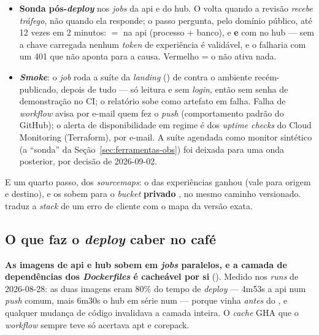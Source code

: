 \begin{itemize}
  \item \textbf{Sonda pós-\emph{deploy}} nos \emph{jobs} da api e do hub. O
     volta quando a revisão \emph{recebe tráfego}, não
    quando ela responde; o passo pergunta, pelo domínio público, até 12 vezes
    em 2 minutos:  \(=\)  na api (processo +
    banco), e  \textbf{e} 
    com  no hub --- sem a chave carregada nenhum \emph{token} de
    experiência é validável, e o  falharia com um 401 que não
    aponta para a causa. Vermelho = o  não ativa nada.
  \item \textbf{\emph{Smoke}}: o \emph{job}  roda a suíte da
    \emph{landing} () de  contra o ambiente
    recém-publicado, depois de tudo --- só leitura e sem \emph{login}, então sem
    senha de demonstração no CI; o relatório sobe como artefato em falha.
    Falha de \emph{workflow} avisa por e-mail quem fez o \emph{push}
    (comportamento padrão do GitHub); o alerta de disponibilidade em regime é
    dos \emph{uptime checks} do Cloud Monitoring (Terraform), por e-mail. A
    suíte agendada como monitor sintético (a \enquote{sonda} da
    Seção~\ref{sec:ferramentas-obs}) foi deixada para uma onda posterior, por
    decisão de 2026-09-02.
\end{itemize}

E um quarto passo, dos \emph{sourcemaps}: o  das experiências ganhou
 (vale para origem e destino), e os
 sobem para o \emph{bucket} \textbf{privado} ,
no mesmo caminho versionado.  traduz a
\emph{stack} de um erro de cliente com o mapa da versão exata.

\subsection{O que faz o \emph{deploy} caber no café}

\begin{decisao}
\textbf{As imagens de api e hub sobem em \emph{jobs} paralelos, e a camada de
dependências dos \emph{Dockerfiles} é cacheável por si} (). Medido
nos \emph{runs} de 2026-08-28: as duas imagens eram 80\% do tempo de
\emph{deploy} --- 4m53s a api num \emph{push} comum, mais 6m30s o hub em série
num  --- porque  vinha \emph{antes} do
, e qualquer mudança de código invalidava a camada inteira. O
\emph{cache} GHA que o \emph{workflow} sempre teve só acertava apt e corepack.
\end{decisao}

